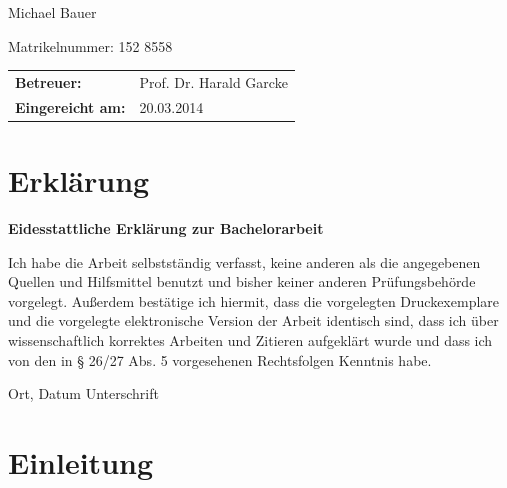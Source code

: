 \begin{center}
\begin{large}
Michael Bauer
\end{large}

\begin{small}
Matrikelnummer: 152 8558
\end{small}

\vspace{1cm}
\begin{tabular}{ll}
{\bf Betreuer:} &Prof. Dr. Harald Garcke\\
{\bf Eingereicht am:} &20.03.2014\\
\end{tabular}

\end{center}
\clearpage

\chapter*{Erklärung}

\textbf{Eidesstattliche Erklärung zur Bachelorarbeit}

Ich habe die Arbeit selbstständig verfasst, keine anderen als die angegebenen Quellen und Hilfsmittel benutzt und bisher keiner anderen Prüfungsbehörde vorgelegt. Außerdem bestätige ich hiermit, dass die vorgelegten Druckexemplare und die vorgelegte elektronische Version der Arbeit identisch sind, dass ich über wissenschaftlich korrektes Arbeiten und Zitieren aufgeklärt wurde und dass ich von den in § 26/27 Abs. 5 vorgesehenen Rechtsfolgen Kenntnis habe.

\vspace{3cm}
Ort, Datum \hspace{5cm} Unterschrift\\


\pagestyle{useheadings} %

\tableofcontents
\listoffigures
\listoftables

\chapter{Einleitung}\label{c.Einleitung}

